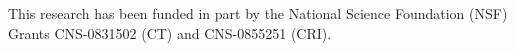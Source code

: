 
This research has been funded in part by the National Science
Foundation (NSF) Grants CNS-0831502 (CT) and CNS-0855251 (CRI).

